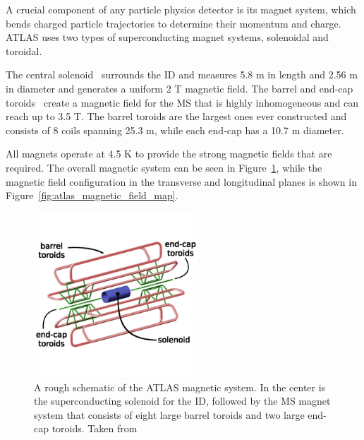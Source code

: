 A crucial component of any particle physics detector is its magnet system, which bends charged particle trajectories to determine their momentum and charge. ATLAS uses two types of superconducting magnet systems, solenoidal and toroidal.

The central solenoid~\cite{atlas_central_solenoid} surrounds the ID and measures 5.8 m in length and 2.56 m in diameter and generates a uniform 2 T magnetic field. The barrel and end-cap toroids~\cite{atlas_barrel_toroid, atlas_endcap_toroid} create a magnetic field for the MS that is highly inhomogeneous and can reach up to 3.5 T. The barrel toroids are the largest ones ever constructed and consists of 8 coils spanning 25.3 m, while each end-cap has a 10.7 m diameter.

All magnets operate at 4.5 K to provide the strong magnetic fields that are required. The overall magnetic system can be seen in Figure~\ref{fig:atlas_magnet_system}, while the magnetic field configuration in the transverse and longitudinal planes is shown in Figure~\ref{fig:atlas_magnetic_field_map}.
\begin{figure}
    \centering
    \includegraphics[width=0.55\textwidth]{figures/atlas/atlas_magnetic_system_illustration.png}
    \caption{A rough schematic of the ATLAS magnetic system. In the center is the superconducting solenoid for the ID, followed by the MS magnet system that consists of eight large barrel toroids and two large end-cap toroids. Taken from~\cite{atlas_magnetic_system_illustration}}\label{fig:atlas_magnet_system}
\end{figure}
